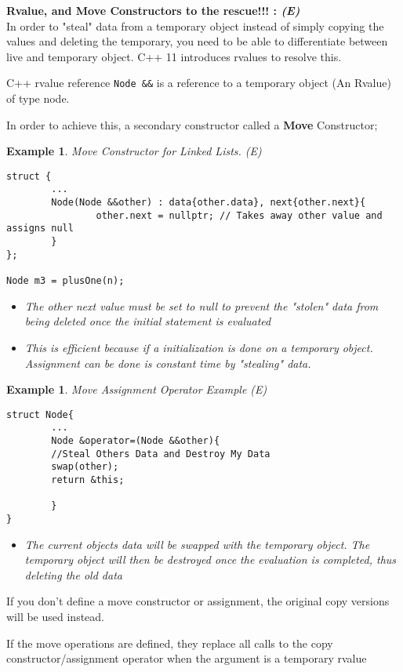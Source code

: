 \documentclass{article}
\newtheorem{ex}[theorem]{Example}
\newenvironment{ablock}[1]{%
    \tcolorbox[beamer,%
    noparskip,breakable,
    colback=lightcoral,colframe=darkred,%
    colbacklower=tomato!75!lightcoral,%
    title=#1]}%
    {\endtcolorbox}
\begin{document}
\textbf{Rvalue, and Move Constructors to the rescue!!! : \textit{(E)}}\\
In order to "steal" data from a temporary object instead of simply copying the values and deleting the temporary, you need to be able to differentiate between live and temporary object. C++ 11 introduces rvalues to resolve this. 

C++ rvalue reference \verb|Node &&| is a reference to a temporary object (An Rvalue) of type node. 

In order to achieve this, a secondary constructor called a \textbf{Move} Constructor;


\begin{ex} Move Constructor for Linked Lists. \textit{(E)}
\begin{lstlisting}
struct {
		...
		Node(Node &&other) : data{other.data}, next{other.next}{
				other.next = nullptr; // Takes away other value and assigns null
		}
};

Node m3 = plusOne(n);
\end{lstlisting}
\begin{itemize}
\item The other next value must be set to null to prevent the "stolen" data from being deleted once the initial statement is evaluated
\item This is efficient because if a initialization is done on a temporary object. Assignment can be done is constant time by "stealing" data.  
\end{itemize}
\end{ex}

\begin{ex} Move Assignment Operator Example \textit{(E)}
\begin{lstlisting}
struct Node{
		...
		Node &operator=(Node &&other){
		//Steal Others Data and Destroy My Data
		swap(other);
		return &this;
		
		}
}
\end{lstlisting}
\begin{itemize}
\item The current objects data will be swapped with the temporary object. The temporary object will then be destroyed once the evaluation is completed, thus deleting the old data
\end{itemize} 
\end{ex}

\begin{ablock} {Note : \textit{(E)}}
If you don't define a move constructor or assignment, the original copy versions will be used instead. 

If the move operations are defined, they replace all calls to the copy constructor/assignment operator when the argument is a temporary rvalue 
\end{ablock}
 
\end{document}
